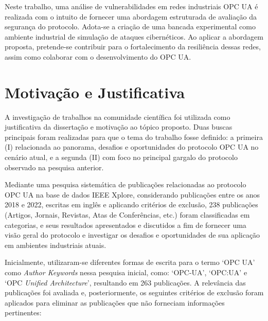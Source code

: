     Neste trabalho, uma análise de vulnerabilidades em redes industriais OPC UA é realizada com o intuito de fornecer uma abordagem estruturada de avaliação da segurança do protocolo. Adota-se a criação de uma bancada experimental como ambiente industrial de simulação de ataques cibernéticos. Ao aplicar a abordagem proposta, pretende-se contribuir para o fortalecimento da resiliência dessas redes, assim como colaborar com o desenvolvimento do OPC UA.

    
    \section{Motivação e Justificativa} \label{sec:motivacao}

    A investigação de trabalhos na comunidade científica foi utilizada como justificativa da dissertação e motivação ao tópico proposto. Duas buscas principais foram realizadas para que o tema do trabalho fosse definido: a primeira (I) relacionada ao panorama, desafios e oportunidades do protocolo OPC UA no cenário atual, e a segunda (II) com foco no principal gargalo do protocolo observado na pesquisa anterior.
    
    Mediante uma pesquisa sistemática de publicações relacionadas ao protocolo OPC UA na base de dados IEEE Xplore, considerando publicações entre os anos 2018 e 2022, escritas em inglês e aplicando critérios de exclusão, 238 publicações (Artigos, Jornais, Revistas, Atas de Conferências, etc.) foram classificadas em categorias, e seus resultados apresentados e discutidos a fim de fornecer uma visão geral do protocolo e investigar os desafios e oportunidades de sua aplicação em ambientes industriais atuais.

    Inicialmente, utilizaram-se diferentes formas de escrita para o termo `OPC UA' como \textit{Author Keywords} nessa pesquisa inicial, como: `OPC-UA', `OPC:UA' e `OPC \textit{Unified Architecture}', resultando em 263 publicações. A relevância das publicações foi avaliada e, posteriormente, os seguintes critérios de exclusão foram aplicados para eliminar as publicações que não forneciam informações pertinentes:


